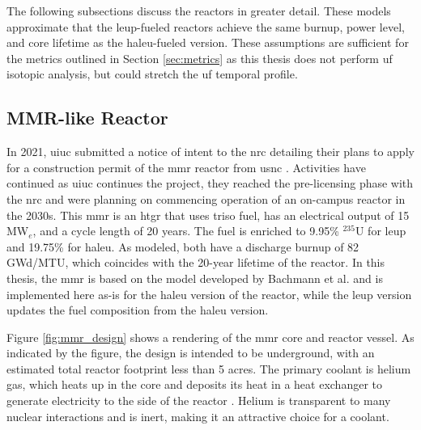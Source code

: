 The following subsections discuss the reactors in greater detail. These models  approximate that the \gls{leup}-fueled reactors achieve the same burnup, power level, and core lifetime as the \gls{haleu}-fueled version. These assumptions are sufficient for the metrics outlined in Section \ref{sec:metrics} as this thesis does not perform \gls{uf} isotopic analysis, but could stretch the \gls{uf} temporal profile.



\subsection{MMR-like Reactor}
\label{sec:mmr}

In 2021, \gls{uiuc} submitted a notice of intent to the \gls{nrc} detailing their plans to apply for a construction permit of the \gls{mmr} reactor from \gls{usnc} \cite{uiuc_notice_nrc_2021}. Activities have continued as \gls{uiuc} continues the project, they reached the pre-licensing phase with the \gls{nrc} and were planning on commencing operation of an on-campus reactor in the 2030s. This \gls{mmr} is an \gls{htgr} that uses \gls{triso} fuel, has an electrical output of 15 MW$_e$, and a cycle length of 20 years. The fuel is enriched to 9.95\% $^{235}$U for \gls{leup} and 19.75\% for \gls{haleu}. As modeled, both have a discharge burnup of 82 GWd/MTU, which coincides with the 20-year lifetime of the reactor. In this thesis, the \gls{mmr} is based on the model developed by Bachmann et al. \cite{bachmann_mmr_like_2023} and is implemented here as-is for the \gls{haleu} version of the reactor, while the \gls{leup} version updates the fuel composition from the \gls{haleu} version.

Figure \ref{fig:mmr_design} shows a rendering of the \gls{mmr} core and reactor vessel. As indicated by the figure, the design is intended to be underground, with an estimated total reactor footprint less than 5 acres. The primary coolant is helium gas, which heats up in the core and deposits its heat in a heat exchanger to generate electricity to the side of the reactor \cite{usnc_chalk_river}. Helium is transparent to many nuclear interactions and is inert, making it an attractive choice for a coolant.

